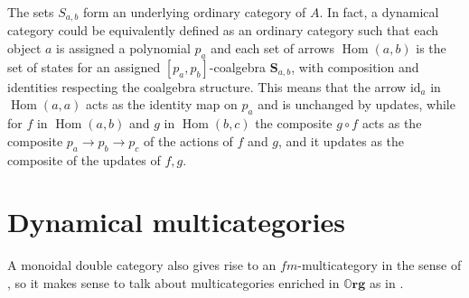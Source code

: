 \documentclass[11pt, one side, article]{memoir}
\theoremstyle{definition}
\theoremstyle{plain}
\DeclareMathOperator{\Hom}{Hom}
\newcommand{\Cat}[1]{\mathbf{#1}}%
\newcommand{\id}{\mathrm{id}}
\newcommand{\0}{\textsf{0}}
\newcommand{\1}{\tn{\textsf{1}}}
\newcommand{\org}{{\mathbb{O}\Cat{rg}}}
\renewcommand{\S}{{\Cat{S}}}
\begin{document}
The sets $S_{a,b}$ form an underlying ordinary category of $A$. 
In fact, a dynamical category could be equivalently defined as an ordinary category such that each object $a$ is assigned a polynomial $p_a$ and each set of arrows $\Hom(a,b)$ is the set of states for an assigned $[p_a,p_b]$-coalgebra $\S_{a,b}$, with composition and identities respecting the coalgebra structure. This means that the arrow $\id_a$ in $\Hom(a,a)$ acts as the identity map on $p_a$ and is unchanged by updates, while for $f$ in $\Hom(a,b)$ and $g$ in $\Hom(b,c)$ the composite $g \circ f$ acts as the composite $p_a \to p_b \to p_c$ of the actions of $f$ and $g$, and it updates as the composite of the updates of $f,g$.



\section{Dynamical multicategories}\label{sec.org_multicats}


A monoidal double category also gives rise to an $f\!m$-multicategory in the sense of \cite{leinster1999generalized}, %
so it makes sense to talk about multicategories enriched in $\org$ as in \cite{leinster1999generalized}. %
\end{document}
